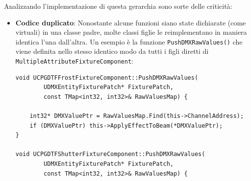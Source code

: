 \documentclass[main.tex]{subfiles}
\begin{document}
Analizzando l'implementazione di questa gerarchia sono sorte delle criticità:
\begin{itemize}
    \item \textbf{Codice duplicato}: Nonostante alcune funzioni siano state dichiarate (come virtuali) in una classe padre, molte classi figlie le reimplementano in maniera identica l'una dall'altra. Un esempio è la funzione \lstinline{PushDMXRawValues()} che viene definita nello stesso identico modo da tutti i figli diretti di \lstinline{MultipleAttributeFixtureComponent}:
\lstset{language=UEcpp}
\begin{lstlisting}
void UCPGDTFFrostFixtureComponent::PushDMXRawValues(
        UDMXEntityFixturePatch* FixturePatch,
        const TMap<int32, int32>& RawValuesMap) {

	int32* DMXValuePtr = RawValuesMap.Find(this->ChannelAddress);
	if (DMXValuePtr) this->ApplyEffectToBeam(*DMXValuePtr);
}

void UCPGDTFShutterFixtureComponent::PushDMXRawValues(
        UDMXEntityFixturePatch* FixturePatch,
        const TMap<int32, int32>& RawValuesMap) {


\end{lstlisting}
\end{itemize}
\end{document}
